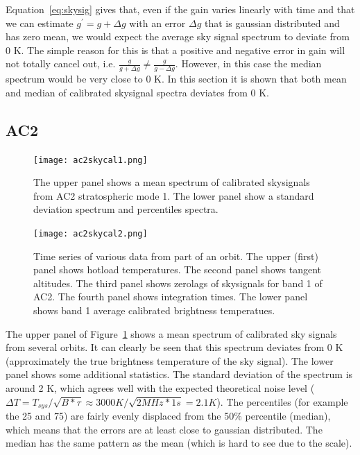 Equation~\ref{eq:skysig} gives that, even if the gain varies
linearly with time and that we can estimate \(g^{'}=g+\Delta g\) with
an error \(\Delta g\) that is gaussian distributed and has zero mean,
we would expect the average sky signal spectrum to deviate from 
0 K. The simple reason for this is that a positive and negative
error in gain will not totally cancel out, i.e. 
\(\frac{g}{g+\Delta g} \neq \frac{g}{g-\Delta g}\).    
However, in this case the median spectrum would be very close to
0 K.
In this section it is shown that both mean and median of calibrated
skysignal spectra deviates from 0 K.


\clearpage
\newpage

\subsection{AC2}
\begin{figure}[!t]
\centering
\texttt{[image: ac2skycal1.png]}\\
\caption{The upper panel shows a mean spectrum of calibrated
skysignals from AC2 stratospheric mode 1. 
The lower panel show a standard deviation spectrum
and percentiles spectra.}
\label{fig:study3ac2a}
\end{figure}

\begin{figure}[!t]
\centering
\texttt{[image: ac2skycal2.png]}\\
\caption{Time series of various data from part of an orbit.
The upper (first) panel shows hotload temperatures.
The second panel shows tangent altitudes.
The third panel shows zerolags of skysignals for band 1 of AC2.
The fourth panel shows integration times.
The lower panel shows band 1 average calibrated brightness temperatues.}
\label{fig:study3ac2b}
\end{figure}


The upper panel of Figure~\ref{fig:study3ac2a} shows a mean spectrum
of calibrated sky signals from several orbits. It can clearly be seen
that this spectrum deviates from 0 K (approximately the true brightness 
temperature of the sky signal).
The lower panel shows some additional statistics.
The standard deviation of the spectrum is around 2 K,
which agrees well with the expected theoretical noise level
(\(\Delta T =T_{sys}/\sqrt{B*\tau} \approx 3000 K / \sqrt{2MHz*1s}=2.1 K\)).
The percentiles (for example the 25 and 75) are fairly evenly
displaced from the 50\% percentile (median),
which means that the errors are at least close to gaussian
distributed.  
The median has the same pattern as the mean (which is hard to see
due to the scale).

